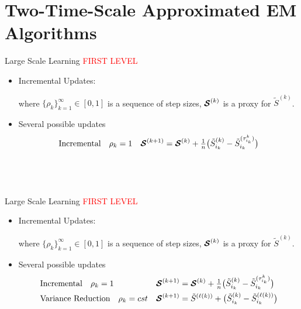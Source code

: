 \documentclass[10pt]{beamer}
\begin{document}
\section{Two-Time-Scale Approximated EM Algorithms}


     

\begin{frame}{Large Scale Learning}
\textcolor{red}{FIRST LEVEL}
\begin{itemize}
\item Incremental Updates:
\begin{center}
\end{center}
where $\{ \rho_{k} \}_{k=1}^\infty \in [0,1]$ is a sequence of step sizes, ${\bm{\mathcal{S}}}^{(k)}$ is a proxy for $\tilde{S}^{(k)}$.
\item Several possible updates
\begin{align}
& \textrm{Incremental} \quad \rho_k = 1 & {\bm{\mathcal{S}}}^{(k+1)} &= {\bm{\mathcal{S}}}^{(k)} + {\textstyle \frac{1}{n}}\big( \tilde{S}_{i_k}^{(k)}  - \tilde{S}_{i_k}^{(\tau_{i_k}^k)} \big)\notag\\
&    &&\notag\\
&    &&\notag\\
&    &&\notag
\end{align}

\end{itemize}

\end{frame}

\begin{frame}{Large Scale Learning}
\textcolor{red}{FIRST LEVEL}
\begin{itemize}
\item Incremental Updates:
\begin{center}
\end{center}
where $\{ \rho_{k} \}_{k=1}^\infty \in [0,1]$ is a sequence of step sizes, ${\bm{\mathcal{S}}}^{(k)}$ is a proxy for $\tilde{S}^{(k)}$.
\item Several possible updates
\begin{align}
& \textrm{Incremental} \quad \rho_k = 1 & {\bm{\mathcal{S}}}^{(k+1)} &= {\bm{\mathcal{S}}}^{(k)} + {\textstyle \frac{1}{n}}\big( \tilde{S}_{i_k}^{(k)}  - \tilde{S}_{i_k}^{(\tau_{i_k}^k)} \big)\notag\\
& \textrm{Variance Reduction} \quad \rho_k = cst & {\bm{\mathcal{S}}}^{(k+1)} &= \tilde{S}^{(\ell(k))} +  \big( \tilde{S}_{i_k}^{(k)}  -\tilde{S}_{i_k}^{(\ell(k))}\big)  \notag\\
&    &&\notag\\
&    &&\notag
\end{align}
\end{itemize}
\end{frame}
\end{document}
